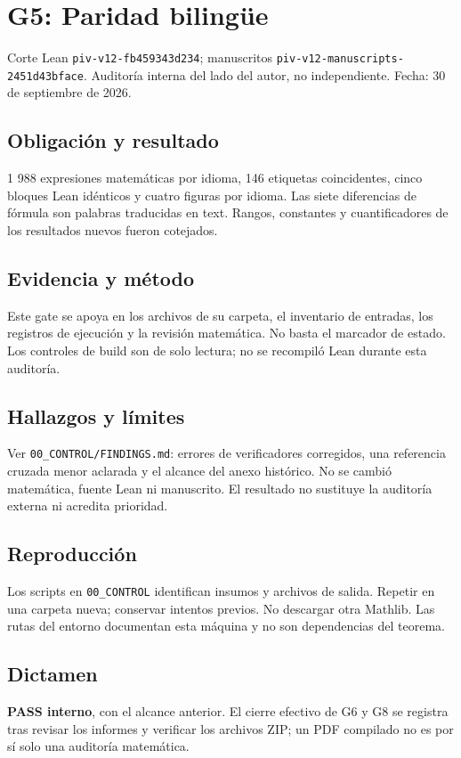 \section{G5: Paridad bilingüe}\label{g5-paridad-bilinguxfce}

Corte Lean \texttt{piv-v12-fb459343d234}; manuscritos
\texttt{piv-v12-manuscripts-2451d43bface}. Auditoría interna del lado
del autor, no independiente. Fecha: 30 de septiembre de 2026.

\subsection{Obligación y resultado}\label{obligaciuxf3n-y-resultado}

1 988 expresiones matemáticas por idioma, 146 etiquetas coincidentes,
cinco bloques Lean idénticos y cuatro figuras por idioma. Las siete
diferencias de fórmula son palabras traducidas en text. Rangos,
constantes y cuantificadores de los resultados nuevos fueron cotejados.

\subsection{Evidencia y método}\label{evidencia-y-muxe9todo}

Este gate se apoya en los archivos de su carpeta, el inventario de
entradas, los registros de ejecución y la revisión matemática. No basta
el marcador de estado. Los controles de build son de solo lectura; no se
recompiló Lean durante esta auditoría.

\subsection{Hallazgos y límites}\label{hallazgos-y-luxedmites}

Ver \texttt{00\_CONTROL/FINDINGS.md}: errores de verificadores
corregidos, una referencia cruzada menor aclarada y el alcance del anexo
histórico. No se cambió matemática, fuente Lean ni manuscrito. El
resultado no sustituye la auditoría externa ni acredita prioridad.

\subsection{Reproducción}\label{reproducciuxf3n}

Los scripts en \texttt{00\_CONTROL} identifican insumos y archivos de
salida. Repetir en una carpeta nueva; conservar intentos previos. No
descargar otra Mathlib. Las rutas del entorno documentan esta máquina y
no son dependencias del teorema.

\subsection{Dictamen}\label{dictamen}

\textbf{PASS interno}, con el alcance anterior. El cierre efectivo de G6
y G8 se registra tras revisar los informes y verificar los archivos ZIP;
un PDF compilado no es por sí solo una auditoría matemática.

